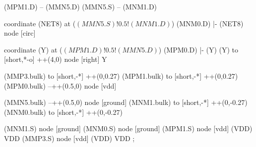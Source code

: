 \begin{circuitikz}[american]
	(MPM1.D) -- (MMN5.D)
	(MMN5.S) -- (MNM1.D)
	
	coordinate (NET8) at ($(MMN5.S)!0.5!(MNM1.D)$)
	(MNM0.D) |- (NET8) node [circ] {}
	
	coordinate (Y) at ($(MPM1.D)!0.5!(MMN5.D)$)
	(MPM0.D) |- (Y)
	(Y) to [short,*-o] ++(4,0) node [right] {Y}
	
	(MMP3.bulk) to [short,-*] ++(0,0.27)
	(MPM1.bulk) to [short,-*] ++(0,0.27)	
	(MPM0.bulk) --++(0.5,0) node [vdd]{}
	
	(MMN5.bulk) --++(0.5,0) node [ground]{}
	(MNM1.bulk) to [short,-*] ++(0,-0.27) 
	(MNM0.bulk) to [short,-*] ++(0,-0.27)


	(MNM1.S) node [ground] {}
	(MNM0.S) node [ground] {}
	(MPM1.S) node [vdd] (VDD) {VDD}
	(MMP3.S) node [vdd] (VDD) {VDD}
;

\end{circuitikz}

